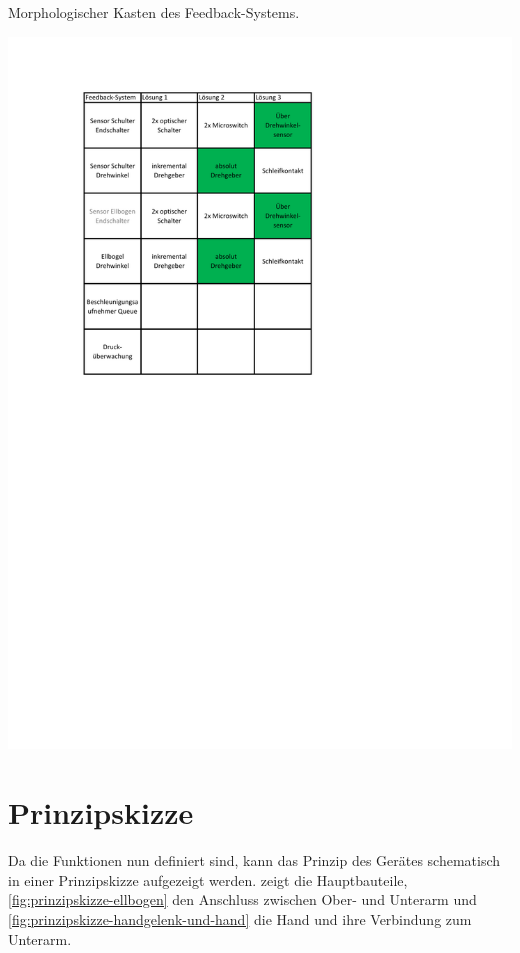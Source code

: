 	\begin{table}[h]
		\caption[Morphologischer Kasten des Feedback-Systems]{Morphologischer Kasten des Feedback-Systems.}
		\centering
		\includegraphics[width=\textwidth]{Abb/Morphologischer_Kasten_Feedback-System}
		\label{fig:morphologische-kasten-feedback-system}
	\end{table}

\section{Prinzipskizze}
	Da die Funktionen nun definiert sind, kann das Prinzip des Gerätes schematisch in einer Prinzipskizze aufgezeigt werden.
	 zeigt die Hauptbauteile, \cref{fig:prinzipskizze-ellbogen} den Anschluss zwischen Ober- und Unterarm und \cref{fig:prinzipskizze-handgelenk-und-hand} die Hand und ihre Verbindung zum Unterarm.

